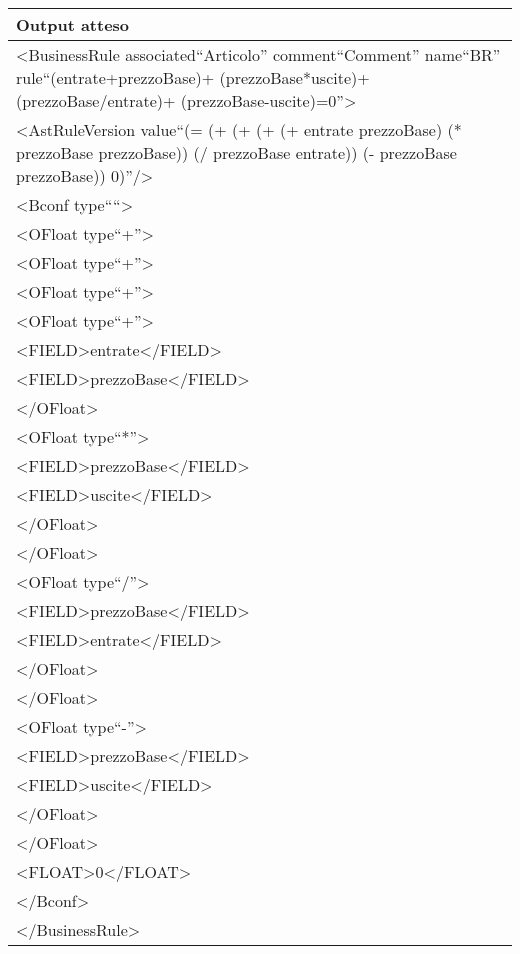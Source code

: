 \begin{center}
\begin{tabular}{|p{11cm}|} \hline
\textbf{Output atteso}\\ \hline
\textless BusinessRule associated``Articolo'' comment``Comment'' name``BR'' rule``(entrate+prezzoBase)+ (prezzoBase*uscite)+ (prezzoBase/entrate)+ (prezzoBase-uscite)=0''\textgreater\\
\textless AstRuleVersion value``(= (+ (+ (+ (+ entrate prezzoBase) (* prezzoBase prezzoBase)) (/ prezzoBase entrate)) (- prezzoBase prezzoBase)) 0)''/\textgreater\\
\textless Bconf type````\textgreater\\
\textless OFloat type``+''\textgreater\\
\textless OFloat type``+''\textgreater\\
\textless OFloat type``+''\textgreater\\
\textless OFloat type``+''\textgreater\\
\textless FIELD\textgreater entrate\textless /FIELD\textgreater\\
\textless FIELD\textgreater prezzoBase\textless /FIELD\textgreater\\
\textless /OFloat\textgreater\\
\textless OFloat type``*''\textgreater\\
\textless FIELD\textgreater prezzoBase\textless /FIELD\textgreater\\
\textless FIELD\textgreater uscite\textless /FIELD\textgreater\\
\textless /OFloat\textgreater\\
\textless /OFloat\textgreater\\
\textless OFloat type``/''\textgreater\\
\textless FIELD\textgreater prezzoBase\textless /FIELD\textgreater\\
\textless FIELD\textgreater entrate\textless /FIELD\textgreater\\
\textless /OFloat\textgreater\\
\textless /OFloat\textgreater\\
\textless OFloat type``-''\textgreater\\
\textless FIELD\textgreater prezzoBase\textless /FIELD\textgreater\\
\textless FIELD\textgreater uscite\textless /FIELD\textgreater\\
\textless /OFloat\textgreater\\
\textless /OFloat\textgreater\\
\textless FLOAT\textgreater0\textless /FLOAT\textgreater\\
\textless /Bconf\textgreater\\
\textless /BusinessRule\textgreater\\
 \hline
\end{tabular} \\
\end{center}

